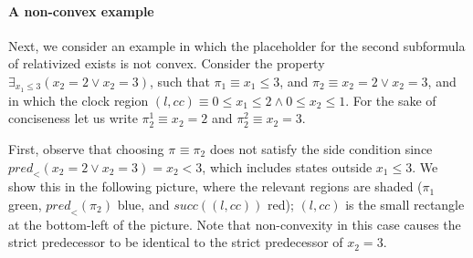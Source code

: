 \documentclass{article}
\newcommand{\placeholder}[1][]{\pi_{#1}}
\newcommand{\loc}{l}
\newcommand{\region}{\mathit{cc}}
\newcommand{\suc}{\mathit{succ}}
\newcommand{\pre}{\mathit{pred}}
\begin{document}
\paragraph{A non-convex example}
Next, we consider an example in which the placeholder for the second subformula
of relativized exists is not convex. Consider the property 
 $\exists_{x_1 \leq 3}(x_2 = 2 \lor x_2 = 3)$, such that
 $\placeholder[1] \equiv x_1 \leq 3$, and $\placeholder[2] \equiv x_2 = 2 \lor 
 x_2 = 3$, and in which the clock region
 $(\loc, \region) \equiv 0 \leq x_1 \leq 2 \land 0 \leq x_2 \leq 1$.
 For the sake of conciseness let us write $\placeholder[2]^{1} \equiv x_2 = 2$ and
 $\placeholder[2]^2 \equiv x_2 = 3$.

First, observe that choosing $\placeholder \equiv \placeholder[2]$
does not satisfy the side condition since $\pre_{<}(x_2 = 2 \lor x _2 = 3) = x_2 < 3$, which includes states outside $x_1 \leq 3$. We show this in the following picture,
where the relevant regions are shaded ($\placeholder[1]$ green, 
$\pre_{<}(\placeholder[2])$ blue, and $\suc((\loc, \region))$ red);
$(\loc, \region)$ is the small rectangle at the bottom-left of the picture.
Note that non-convexity in this case causes the strict predecessor to be identical
to the strict predecessor of $x_2 = 3$.
\end{document}
